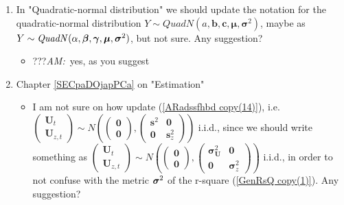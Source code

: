 \documentclass{article}
\begin{document}
\begin{enumerate}
\item In "Quadratic-normal distribution" we should update the notation for
the quadratic-normal distribution $Y\sim \mathit{QuadN}(a,\boldsymbol{b},%
\boldsymbol{c},\boldsymbol{\mu },\boldsymbol{\sigma }^{2})$, maybe as $Y\sim 
\mathit{QuadN}(\alpha ,\boldsymbol{\beta },\boldsymbol{\gamma },\boldsymbol{%
\mu },\boldsymbol{\sigma }^{2})$, but not sure. Any suggestion?

\begin{itemize}
\item ???\textsl{AM:}\ yes, as you suggest
\end{itemize}

\item Chapter \ref{SECpaDOjapPCa} on "Estimation"

\begin{itemize}
\item I am not sure on how update (\ref{ARadssfhbd copy(14)}), i.e. $\left( 
\begin{smallmatrix}
\boldsymbol{U}_{t} \\ 
\boldsymbol{U}_{z,t}%
\end{smallmatrix}%
\right) \sim \mathit{N}(\left( 
\begin{smallmatrix}
\boldsymbol{0} \\ 
\boldsymbol{0}%
\end{smallmatrix}%
\right) ,\left( 
\begin{smallmatrix}
\boldsymbol{s}^{2} & \boldsymbol{0} \\ 
\boldsymbol{0} & \boldsymbol{s}_{z}^{2}%
\end{smallmatrix}%
\right) )$ i.i.d., since we should write something as $\left( 
\begin{smallmatrix}
\boldsymbol{U}_{t} \\ 
\boldsymbol{U}_{z,t}%
\end{smallmatrix}%
\right) \sim \mathit{N}(\left( 
\begin{smallmatrix}
\boldsymbol{0} \\ 
\boldsymbol{0}%
\end{smallmatrix}%
\right) ,\left( 
\begin{smallmatrix}
\boldsymbol{\sigma }_{\boldsymbol{U}}^{2} & \boldsymbol{0} \\ 
\boldsymbol{0} & \boldsymbol{\sigma }_{z}^{2}%
\end{smallmatrix}%
\right) )$ i.i.d., in order to not confuse with the metric $\boldsymbol{%
\sigma }^{2}$ of the r-square (\ref{GenRsQ copy(1)}). Any suggestion?


\end{itemize}
\end{enumerate}
\end{document}
